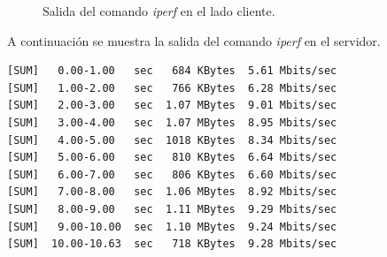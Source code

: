 \begin{figure}[H]
    \centering
    \hspace{1.5cm}
    \caption{Salida del comando \textit{iperf} en el lado cliente.}
\end{figure}

A continuación se muestra la salida del comando \textit{iperf} en el servidor.
\begin{lstlisting}
[SUM]   0.00-1.00   sec   684 KBytes  5.61 Mbits/sec 
[SUM]   1.00-2.00   sec   766 KBytes  6.28 Mbits/sec 
[SUM]   2.00-3.00   sec  1.07 MBytes  9.01 Mbits/sec     
[SUM]   3.00-4.00   sec  1.07 MBytes  8.95 Mbits/sec 
[SUM]   4.00-5.00   sec  1018 KBytes  8.34 Mbits/sec 
[SUM]   5.00-6.00   sec   810 KBytes  6.64 Mbits/sec 
[SUM]   6.00-7.00   sec   806 KBytes  6.60 Mbits/sec
[SUM]   7.00-8.00   sec  1.06 MBytes  8.92 Mbits/sec 
[SUM]   8.00-9.00   sec  1.11 MBytes  9.29 Mbits/sec  
[SUM]   9.00-10.00  sec  1.10 MBytes  9.24 Mbits/sec 
[SUM]  10.00-10.63  sec   718 KBytes  9.28 Mbits/sec 

\end{lstlisting}

